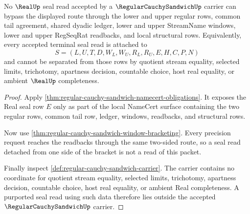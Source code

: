 \begin{theorem}
\label{thm:regular-cauchy-sandwich-real-seal-nonescape}
No $\RealUp$ seal read accepted by a $\RegularCauchySandwichUp$ carrier can bypass the displayed route through the lower and upper regular rows, common tail agreement, shared dyadic ledger, lower and upper StreamName windows, lower and upper RegSeqRat readbacks, and local structural rows. Equivalently, every accepted terminal seal read is attached to
$$
S=(L,U,T,D,W_L,W_U,R_L,R_U,E,H,C,P,N)
$$
and cannot be separated from those rows by quotient stream equality, selected limits, trichotomy, apartness decision, countable choice, host real equality, or ambient $\RealUp$ completeness.
\end{theorem}
\begin{proof}
Apply \autoref{thm:regular-cauchy-sandwich-namecert-obligations}. It exposes the Real seal row $E$ only as part of the local NameCert surface containing the two regular rows, common tail row, ledger, windows, readbacks, and structural rows.

Now use \autoref{thm:regular-cauchy-sandwich-window-bracketing}. Every precision request reaches the readbacks through the same two-sided route, so a seal read detached from one side of the bracket is not a read of this packet.

Finally inspect \autoref{def:regular-cauchy-sandwich-carrier}. The carrier contains no coordinate for quotient stream equality, selected limits, trichotomy, apartness decision, countable choice, host real equality, or ambient Real completeness. A purported seal read using such data therefore lies outside the accepted $\RegularCauchySandwichUp$ carrier.
\end{proof}

